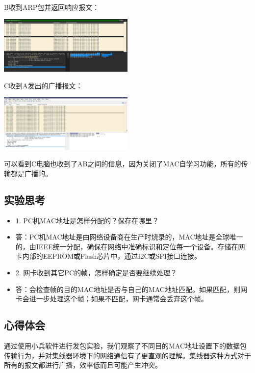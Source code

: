 \documentclass{article}
\begin{document}
B收到ARP包并返回响应报文：
\begin{center}
    \includegraphics[width=0.5\textwidth]{2_2_images/12.png}
\end{center}
\vspace{10pt}

C收到A发出的广播报文：
\begin{center}
    \includegraphics[width=0.5\textwidth]{2_2_images/13.png}
\end{center}
\vspace{10pt}

可以看到C电脑也收到了AB之间的信息，因为关闭了MAC自学习功能，所有的传输都是广播的。

\subsection{实验思考}
\begin{itemize}
    \item 1. PC机MAC地址是怎样分配的？保存在哪里？
    \item 答：PC机MAC地址是由网络设备商在生产时烧录的，MAC地址是全球唯一的，由IEEE统一分配，确保在网络中准确标识和定位每一个设备。存储在网卡内部的EEPROM或Flash芯片中，通过I2C或SPI接口连接。
    
    \item 2. 网卡收到其它PC的帧，怎样确定是否要继续处理？
    \item 答：会检查帧的目的MAC地址是否与自己的MAC地址匹配。如果匹配，则网卡会进一步处理这个帧；如果不匹配，网卡通常会丢弃这个帧。
\end{itemize}

\subsection{心得体会}
通过使用小兵软件进行发包实验，我们观察了不同目的MAC地址设置下的数据包传输行为，并对集线器环境下的网络通信有了更直观的理解。集线器这种方式对于所有的报文都进行广播，效率低而且可能产生冲突。
\end{document}
